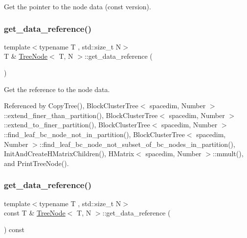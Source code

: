 Get the pointer to the node data (const version). \mbox{\label{classTreeNode_a7bf414928c965e707e0246f7a90a747d}} 
\subsubsection{\texorpdfstring{get\+\_\+data\+\_\+reference()}{get\_data\_reference()}\hspace{0.1cm}{\footnotesize\ttfamily [1/2]}}
{\footnotesize\ttfamily template$<$typename T , std\+::size\+\_\+t N$>$ \\
T \& \hyperlink{classTreeNode}{Tree\+Node}$<$ T, N $>$\+::get\+\_\+data\+\_\+reference (\begin{DoxyParamCaption}{ }\end{DoxyParamCaption})}

Get the reference to the node data. 

Referenced by Copy\+Tree(), Block\+Cluster\+Tree$<$ spacedim, Number $>$\+::extend\+\_\+finer\+\_\+than\+\_\+partition(), Block\+Cluster\+Tree$<$ spacedim, Number $>$\+::extend\+\_\+to\+\_\+finer\+\_\+partition(), Block\+Cluster\+Tree$<$ spacedim, Number $>$\+::find\+\_\+leaf\+\_\+bc\+\_\+node\+\_\+not\+\_\+in\+\_\+partition(), Block\+Cluster\+Tree$<$ spacedim, Number $>$\+::find\+\_\+leaf\+\_\+bc\+\_\+node\+\_\+not\+\_\+subset\+\_\+of\+\_\+bc\+\_\+nodes\+\_\+in\+\_\+partition(), Init\+And\+Create\+H\+Matrix\+Children(), H\+Matrix$<$ spacedim, Number $>$\+::mmult(), and Print\+Tree\+Node().

\mbox{\label{classTreeNode_ab051909179e64f75d4588b4618049193}} 
\subsubsection{\texorpdfstring{get\+\_\+data\+\_\+reference()}{get\_data\_reference()}\hspace{0.1cm}{\footnotesize\ttfamily [2/2]}}
{\footnotesize\ttfamily template$<$typename T , std\+::size\+\_\+t N$>$ \\
const T \& \hyperlink{classTreeNode}{Tree\+Node}$<$ T, N $>$\+::get\+\_\+data\+\_\+reference (\begin{DoxyParamCaption}{ }\end{DoxyParamCaption}) const}

